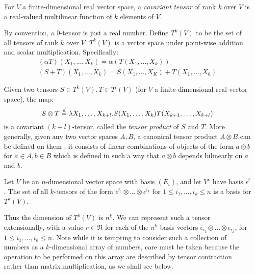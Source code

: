 \documentclass{article} %
\def\withmath#1{\relax\ifmmode#1\else{$ #1 $}\fi}
\def\defeq{\withmath{\stackrel{d}{=}}}
\begin{document}
\begin{definition} For $V$ a finite-dimensional real vector space, a {\em covariant tensor} of rank $k$ over $V$ is a real-valued multilinear function of $k$ elements of $V$.
\end{definition}

By convention, a $0$-tensor is just a real number. Define $T^k(V)$ to be the set of all tensors of rank $k$ over $V$. $T^k(V)$ is a vector space under point-wise addition and scalar multiplication. Specifically:
\[
\begin{array}{l}
  (\alpha T)(X_1, \ldots, X_k) = \alpha(T(X_1, \ldots, X_k))\\
  (S+T)(X_1, \ldots, X_k)=S(X_1, \ldots, X_K) + T(X_1, \ldots, X_k)
\end{array}
\]

Given two tensors \(S \in T^k(V), T \in T^l(V)\) (for \(V\) a finite-dimensional real vector space), the map:
\[ S \otimes T \defeq \lambda X_1, \ldots, X_{k+l}.S(X_1,\ldots, X_k)T(X_{k+1}, \ldots, X_{k+l})\]
\noindent is a covariant \((k+l)\)-tensor, called the {\em tensor product} of \(S\) and \(T\). More generally, given any two vector spaces \(A,B\), a canonical tensor product \(A\otimes B\) can be defined on them \cite[P.~175]{lee-book-2000}. it consists of linear combinations of objects of the form \(a\otimes b\) for \(a\in A, b\in B\) which is defined in such a way that \(a\otimes b\) depends bilinearly on \(a\) and \(b\). 

\begin{proposition} Let \(V\) be an \(n\)-dimensional vector space with basis \((E_i)\), and let \(V^{\star}\) have basis \(\epsilon^i\). The set of all \(k\)-tensors of the form \(\epsilon^{i_1}\otimes \ldots \otimes\epsilon^{i_k}\) for \(1 \leq i_1, \ldots, i_k \leq n\) is a basis for \(T^k(V)\).
\end{proposition}

Thus the dimension of \(T^k(V)\) is \(n^k\). We can represent such a tensor extensionally, with a value $r\in \Re$ for each of the \(n^k\) basis vectors \(\epsilon_{i_1} \otimes \ldots \otimes \epsilon_{i_k}\), for \(1 \leq i_1, \ldots, i_k \leq n\). Note while it is tempting to consider such a collection of numbers as a \(k\)-dimensional array of numbers, care must be taken because the operation to be performed on this array are described by tensor contraction rather than matrix multiplication, as we shall see below. 

\end{document}

